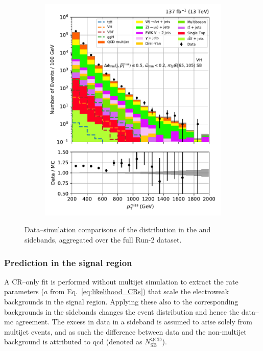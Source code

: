 \begin{figure}[htbp]
\begin{subfigure}[b]{0.49\textwidth}
        \includegraphics[width=\textwidth]{figures/region_plots/full_Run2/sideband/VH.pdf}
        \caption{\VH}
    \end{subfigure}
    \caption[Data--simulation comparisons of the \ptmiss distribution in the \ttH and \VH sidebands, aggregated over the full Run-2 dataset]{Data--simulation comparisons of the \ptmiss distribution in the \ttH and \VH sidebands, aggregated over the full Run-2 dataset.}
    \label{fig:htoinv_sb_yields_combRun2}
\end{figure}




\subsubsection{Prediction in the signal region}
\label{subsubsec:htoinv_qcd_pred_SR}

A \gls{CR}--only fit is performed without multijet simulation to extract the rate parameters ($a$ from Eq.~\ref{eq:likelihood_CRs}) that scale the electroweak backgrounds in the signal region. Applying these also to the corresponding backgrounds in the sidebands changes the event distribution and hence the data--\acrshort{mc} agreement. The excess in data in a sideband is assumed to arise solely from multijet events, and as such the difference between data and the non-multijet background is attributed to \acrshort{qcd} (denoted as $N_{\mathrm{SB}}^{\mathrm{QCD}}$).


